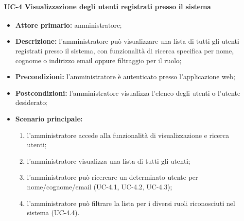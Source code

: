 
\paragraph{UC-4 Visualizzazione degli utenti registrati presso il sistema}

\begin{itemize}
	\item \textbf{Attore primario:} amministratore; 

	\item \textbf{Descrizione:} l'amministratore può visualizzare una lista di tutti gli utenti registrati presso il sistema, con funzionalità di ricerca specifica per nome, cognome o indirizzo email oppure filtraggio per il ruolo;

	\item \textbf{Precondizioni:} l'amministratore è autenticato presso l'applicazione web;

	\item \textbf{Postcondizioni:} l'amministratore visualizza l'elenco degli utenti o l'utente desiderato;

	\item \textbf{Scenario principale:}
	      \begin{enumerate}
		      \item l'amministratore accede alla funzionalità di visualizzazione e ricerca utenti;
		      \item l'amministratore visualizza una lista di tutti gli utenti;
		      \item l'amministratore può ricercare un determinato utente per nome/cognome/email (UC-4.1, UC-4.2, UC-4.3);
		      \item l'amministratore può filtrare la lista per i diversi ruoli riconosciuti nel sistema (UC-4.4).
	      \end{enumerate}
\end{itemize}
